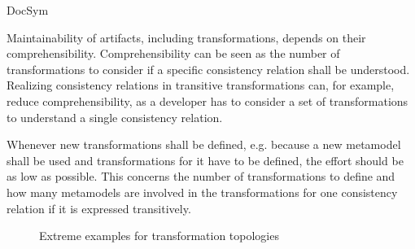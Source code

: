 \begin{copiedFrom}{DocSym}
\begin{description}[leftmargin=\parindent]
\item[Comprehensibility]
Maintainability of artifacts, including transformations, depends on their comprehensibility.
Comprehensibility can be seen as the number of transformations to consider if a specific consistency relation shall be understood.
Realizing consistency relations in transitive transformations can, for example, reduce comprehensibility, as a developer has to consider a set of transformations to understand a single consistency relation. 

\item[Evolvability]
Whenever new transformations shall be defined, e.g. because a new metamodel shall be used and transformations for it have to be defined, the effort should be as low as possible.
This concerns the number of transformations to define and how many metamodels are involved in the transformations for one consistency relation if it is expressed transitively.
\end{description}


\begin{figure}
    \centering
    \begin{minipage}[b]{0.4\columnwidth}
        \centering
        
        \label{fig:properties:topologies:full}
    \end{minipage}
    \hspace{2em}
    \begin{minipage}[b]{0.4\columnwidth}
        \centering
        
        \vspace{1em}
        \label{fig:properties:topologies:tree}
    \end{minipage}
    \caption{Extreme examples for transformation topologies}
    \label{fig:properties:topologies}
\end{figure}


\end{copiedFrom}
